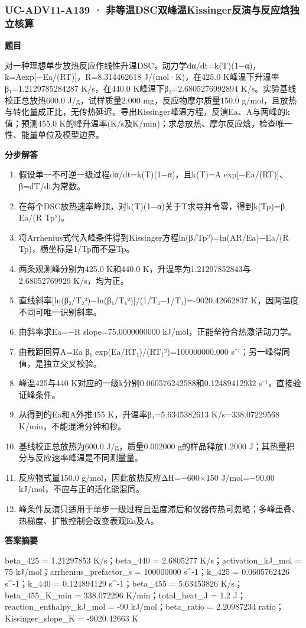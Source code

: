 \documentclass[UTF8,11pt,a4paper]{ctexart}
\begin{document}
\subsubsection*{UC-ADV11-A139 · 非等温DSC双峰温Kissinger反演与反应焓独立核算}
\noindent\textbf{题目}\par
对一种理想单步放热反应作线性升温DSC，动力学dα/dt=k(T)(1−α)，k=Aexp[−Ea/(RT)]，R=8.314462618 J/(mol·K)，在425.0 K峰温下升温率β₁=1.2129785284287 K/s，在440.0 K峰温下β₂=2.6805276992894 K/s。实验基线校正总放热600.0 J/g，试样质量2.000 mg，反应物摩尔质量150.0 g/mol，且放热与转化量成正比，无传热延迟。导出Kissinger峰温方程，反演Ea、A与两峰的k值；预测455.0 K的峰升温率(K/s及K/min)；求总放热、摩尔反应焓，检查唯一性、能量单位及模型边界。\par
\medskip\noindent\textbf{分步解答}
\begin{enumerate}
\item 假设单一不可逆一级过程dα/dt=k(T)(1−α)，且k(T)=A exp[−Ea/(RT)]、β=dT/dt为常数。
\item 在每个DSC放热速率峰顶，对k(T)(1−α)关于T求导并令零，得到k(Tp)=β Ea/(R Tp²)。
\item 将Arrhenius式代入峰条件得到Kissinger方程ln(β/Tp²)=ln(AR/Ea)−Ea/(R Tp)，横坐标是1/Tp而不是Tp。
\item 两条观测峰分别为425.0 K和440.0 K，升温率为1.21297852843与2.68052769929 K/s，均为正。
\item 直线斜率[ln(β₂/T₂²)−ln(β₁/T₁²)]/(1/T₂−1/T₁)=-9020.42662837 K，因两温度不同可唯一识别斜率。
\item 由斜率求Ea=−R slope=75.0000000000 kJ/mol，正能垒符合热激活动力学。
\item 由截距回算A=Ea β₁ exp(Ea/RT₁)/(RT₁²)=100000000.000 s⁻¹；另一峰得同值，是独立交叉校验。
\item 峰温425与440 K对应的一级k分别0.060576242588和0.12489412932 s⁻¹，直接验证峰条件。
\item 从得到的Ea和A外推455 K，升温率β₃=5.6345382613 K/s=338.07229568 K/min，不能混淆分钟和秒。
\item 基线校正总放热为600.0 J/g，质量0.002000 g的样品释放1.2000 J；其热量积分与反应速率峰温是不同测量量。
\item 反应物式量150.0 g/mol，因此放热反应ΔH=−600×150 J/mol=−90.00 kJ/mol，不应与正的活化能混同。
\item 峰条件反演只适用于单步一级过程且温度滞后和仪器传热可忽略；多峰重叠、热梯度、扩散控制会改变表观Ea及A。
\end{enumerate}
\noindent\textbf{答案摘要}\par
beta\_425 = 1.21297853 K/s；beta\_440 = 2.6805277 K/s；activation\_kJ\_mol = 75 kJ/mol；arrhenius\_prefactor\_s = 100000000 s\textasciicircum{}-1；k\_425 = 0.0605762426 s\textasciicircum{}-1；k\_440 = 0.124894129 s\textasciicircum{}-1；beta\_455 = 5.63453826 K/s；beta\_455\_K\_min = 338.072296 K/min；total\_heat\_J = 1.2 J；reaction\_enthalpy\_kJ\_mol = -90 kJ/mol；beta\_ratio = 2.20987234 ratio；Kissinger\_slope\_K = -9020.42663 K\par
\end{document}

